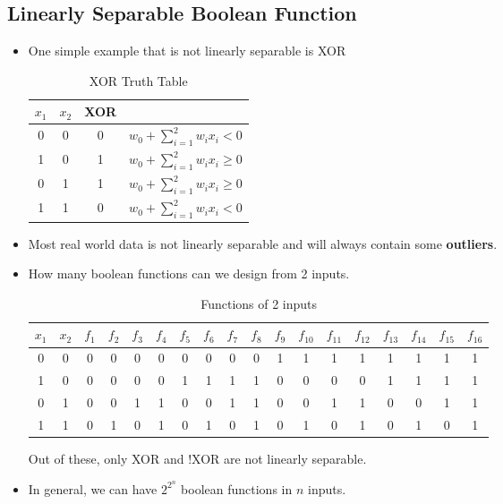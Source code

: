 \documentclass[a4paper]{article}
\begin{document}
\subsection{Linearly Separable Boolean Function}
\begin{itemize}
    \item One simple example that is not linearly separable is XOR
    \begin{table}[H]
        \centering
        \begin{tabular}{cccc}
            \hline
            $x_1$ & $x_2$ & XOR &  \\
            \hline
            0 & 0 & 0 & $w_0+\sum_{i=1}^2w_ix_i<0$\\
            1 & 0 & 1 & $w_0+\sum_{i=1}^2w_ix_i\geq0$\\
            0 & 1 & 1 & $w_0+\sum_{i=1}^2w_ix_i\geq0$\\
            1 & 1 & 0 & $w_0+\sum_{i=1}^2w_ix_i<0$\\
            \hline
        \end{tabular}
        \caption{XOR Truth Table}
        \label{tab:DL-XOR-truth}
    \end{table}
    \item Most real world data is not linearly separable and will always contain some \textbf{outliers}.
    \item How many boolean functions can we design from 2 inputs.
    \begin{table}[H]
        \centering
        \begin{tabular}{cccccccccccccccccc}
            \hline
            $x_1$ & $x_2$ & $f_1$ & $f_2$ & $f_3$ & $f_4$ & $f_5$ & $f_6$ & $f_7$ & $f_8$ & $f_9$ & $f_{10}$ & $f_{11}$ & $f_{12}$ & $f_{13}$ & $f_{14}$ & $f_{15}$ & $f_{16}$ \\
            \hline
            0 & 0 & 0 & 0 & 0 & 0 & 0 & 0 & 0 & 0 & 1 & 1 & 1 & 1 & 1 & 1 & 1 & 1\\
            1 & 0 & 0 & 0 & 0 & 0 & 1 & 1 & 1 & 1 & 0 & 0 & 0 & 0 & 1 & 1 & 1 & 1\\
            0 & 1 & 0 & 0 & 1 & 1 & 0 & 0 & 1 & 1 & 0 & 0 & 1 & 1 & 0 & 0 & 1 & 1\\
            1 & 1 & 0 & 1 & 0 & 1 & 0 & 1 & 0 & 1 & 0 & 1 & 0 & 1 & 0 & 1 & 0 & 1\\
            \hline
        \end{tabular}
        \caption{Functions of 2 inputs}
        \label{tab:DL-2-ip-functions}
    \end{table}
    Out of these, only XOR and !XOR are not linearly separable.
    \item In general, we can have $2^{2^n}$ boolean functions in $n$ inputs.
\end{itemize}
\end{document}
